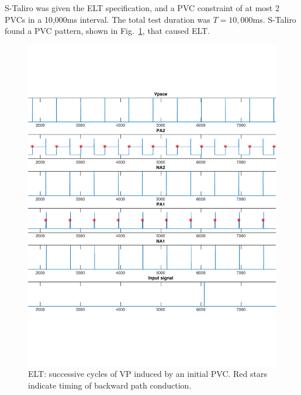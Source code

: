 S-Taliro was given the ELT specification, and a PVC constraint of at most 2 PVCs in a 10,000ms interval. 
The total test duration was $T= 10,000$ms.
S-Taliro found a PVC pattern, shown in Fig.~\ref{fig:bug13_kept1}, that caused ELT.
\begin{figure}[t]
\centering
\includegraphics[scale=0.4]{figures/bug13_kept1}
\caption{ELT: successive cycles of VP induced by an initial PVC. Red stars indicate timing of backward path conduction.}
\label{fig:bug13_kept1}
\end{figure}


